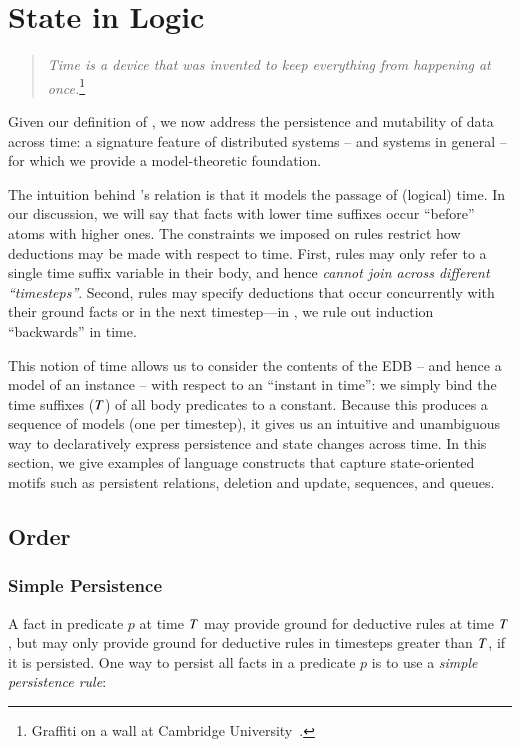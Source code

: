 \section{State in Logic}
\label{sec:stateupdate}


\begin{quote}
%
\emph{Time is a device that was invented to keep everything from
happening at once.}\footnote{Graffiti on a wall at Cambridge
University~\cite{scheme}.}
%
\end{quote} 

Given our definition of \lang, we now address the persistence and mutability
of data across time: a signature feature of distributed systems -- and systems
in general -- for which we provide a model-theoretic foundation.

The intuition behind \lang's  relation is that it models the
passage of (logical) time.  In our discussion, we will say that facts with
lower time suffixes occur ``before'' atoms with higher ones.  The constraints
we imposed on \lang rules restrict how deductions may be made with respect to
time.  First, rules may only refer to a single time suffix variable in their
body, and hence {\em cannot join across different ``timesteps''}.  Second,
rules may specify deductions that occur concurrently with their ground facts or
in the next timestep---in \lang, we rule out induction ``backwards'' in time.

This notion of time allows us to consider the contents of the EDB -- and hence
a model of an instance -- with respect to an ``instant in time'': we simply
bind the time suffixes ($\DT$) of all body predicates to a constant.  Because
this produces a sequence of models (one per timestep), it gives us an intuitive
and unambiguous way to declaratively express persistence and state changes
across time.  In this section, we give examples of language constructs
that capture state-oriented motifs such as persistent relations,
deletion and update, sequences, and queues.

\subsection{Order}

\subsubsection{Simple Persistence}
%
A fact in predicate $p$ at time $\DT$ may provide ground for deductive rules at
time $\DT$, but may only provide ground for deductive rules in timesteps
greater than $\DT$, if it is persisted.  One way to persist all facts in a
predicate $p$ is to use a {\em simple persistence rule}:

